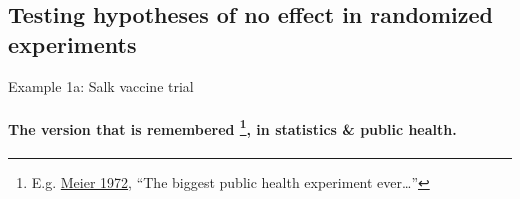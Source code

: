 \subsection{Testing hypotheses of no effect in randomized experiments}
\begin{frame}{Example 1a: Salk vaccine trial}
\framesubtitle{
   The version that is remembered \footnote{E.g.
      \href{http://www.cengage.com/resource_uploads/downloads/0534094929_46500.pdf}{Meier
        1972}, ``The biggest public health experiment ever\ldots''}, in statistics \& public health. }



\end{frame}

